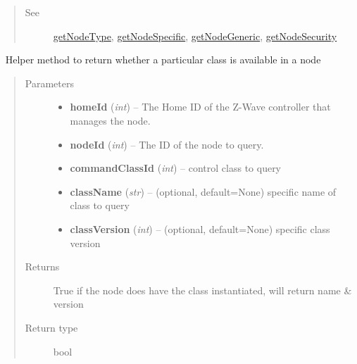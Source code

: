 \documentclass[letterpaper,10pt,english]{sphinxmanual}
\begin{document}
\begin{fulllineitems}
\begin{fulllineitems}
\begin{quote}
\begin{description}
\item[{See}] \leavevmode
{\hyperref[libopenzwave:getnodetype]{getNodeType}}, {\hyperref[libopenzwave:getnodespecific]{getNodeSpecific}}, {\hyperref[libopenzwave:getnodegeneric]{getNodeGeneric}}, {\hyperref[libopenzwave:getnodesecurity]{getNodeSecurity}}

\end{description}\end{quote}

\end{fulllineitems}


\begin{fulllineitems}
\label{libopenzwave:libopenzwave.PyManager.getNodeClassInformation}~\label{libopenzwave:getnodeclassinformation}
Helper method to return whether a particular class is available in a node
\begin{quote}\begin{description}
\item[{Parameters}] \leavevmode\begin{itemize}
\item {} 
\textbf{homeId} (\emph{int}) -- The Home ID of the Z-Wave controller that manages the node.

\item {} 
\textbf{nodeId} (\emph{int}) -- The ID of the node to query.

\item {} 
\textbf{commandClassId} (\emph{int}) -- control class to query

\item {} 
\textbf{className} (\emph{str}) -- (optional, default=None) specific name of class to query

\item {} 
\textbf{classVersion} (\emph{int}) -- (optional, default=None) specific class version

\end{itemize}

\item[{Returns}] \leavevmode
True if the node does have the class instantiated, will return name \& version

\item[{Return type}] \leavevmode
bool

\end{description}\end{quote}


\end{fulllineitems}
\end{fulllineitems}
\end{document}
